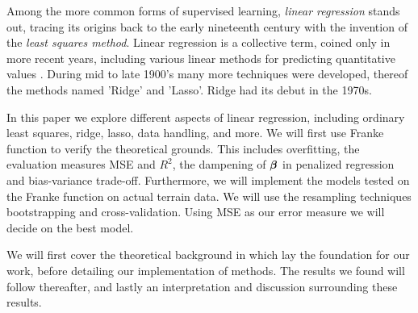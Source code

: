 Among the more common forms of supervised learning, \textit{linear regression} stands out, tracing its origins back to the early nineteenth century with the invention of the \textit{least squares method}. 
Linear regression is a collective term, coined only in more recent years, including various linear methods for predicting quantitative values \citep[ p.~5]{james}. During mid to late 1900's many more techniques were developed, thereof the methods named 'Ridge' and 'Lasso'. Ridge had its debut in the 1970s. 


In this paper we explore different aspects of linear regression, including ordinary least squares, ridge, lasso, data handling, and more. 
We will first use Franke function to verify the theoretical grounds. This includes overfitting, the evaluation measures MSE and $R^2$, the dampening of $\boldsymbol{\beta}$ in penalized regression and bias-variance trade-off. Furthermore, we will implement the models tested on the Franke function on actual terrain data. We will use the resampling techniques bootstrapping and cross-validation. Using MSE as our error measure we will decide on the best model.


We will first cover the theoretical background in which lay the foundation for our work, before detailing our implementation of methods. 
The results we found will follow thereafter, and lastly an interpretation and discussion surrounding these results. 


